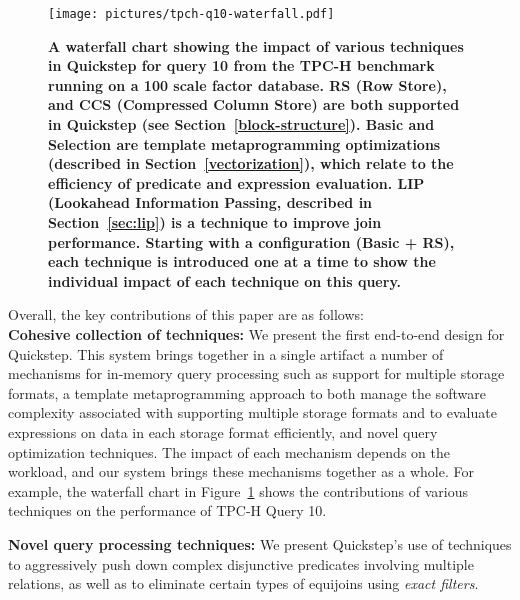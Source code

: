 
\begin{figure}
	\centering
	\texttt{[image: pictures/tpch-q10-waterfall.pdf]}
	\caption{\textbf{A waterfall chart showing the impact of various techniques in Quickstep for query 10 from the TPC-H benchmark running on a 100 scale factor database. RS (Row Store), and CCS (Compressed Column Store) are both supported in Quickstep (see Section~\ref{block-structure}). Basic and Selection are template metaprogramming optimizations (described in Section~\ref{vectorization}), which relate to the efficiency of predicate and expression evaluation. LIP (Lookahead Information Passing, described in Section~\ref{sec:lip}) is a technique to improve join performance. Starting with a configuration (Basic + RS), each technique is introduced one at a time to show the individual impact of each technique on this query.}}
	\label{fig:tpch-q10-waterfall}
\end{figure}

Overall, the key contributions of this paper are as follows:\\
\textbf{Cohesive collection of techniques:} We present the first end-to-end design for Quickstep. This system brings together in a single artifact a number of mechanisms for in-memory query processing such as support for multiple storage formats, a template metaprogramming approach to both manage the software complexity associated with supporting multiple storage formats and to evaluate expressions on data in each storage format efficiently, and novel query optimization techniques.
The impact of each mechanism depends on the workload, and our system brings these mechanisms together as a whole.
For example, the waterfall chart in Figure~\ref{fig:tpch-q10-waterfall} shows the contributions of various techniques on the performance of TPC-H Query 10.

\textbf{Novel query processing techniques:} We present Quickstep's use of techniques to aggressively push down complex disjunctive predicates involving multiple relations, as well as to eliminate certain types of equijoins using \textit{exact filters}.

